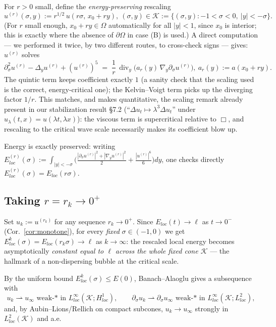 \documentclass[11pt,letterpaper]{amsart}
\newcommand{\dive}{\operatorname{div}}
\newcommand{\Om}{\Omega}
\begin{document}
For $r>0$ small, define the \emph{energy-preserving} rescaling
\[
u^{(r)}(\sigma,y) := r^{1/2}\,u(r\sigma,\, x_0+ry),~ (\sigma,y)\in \mathcal K:=\{(\sigma,y): -1<\sigma<0,\ |y|<-\sigma\}.
\]
(For $r$ small enough, $x_0+ry\in\Om$ automatically for all $|y|<1$, since $x_0$ is interior; this is exactly where the absence of $\partial\Om$ in case (B) is used.) A direct computation --- we performed it twice, by two different routes, to cross-check signs --- gives: $u^{(r)}$ solves
\begin{equation}\label{eq:rescaled}
\partial_\sigma^2u^{(r)} - \Delta_yu^{(r)} + (u^{(r)})^5 \;=\; \frac1r\,\dive_y\Big(a_r(y)\,\nabla_y\partial_\sigma u^{(r)}\Big),~ a_r(y):=a(x_0+ry).
\end{equation}
The quintic term keeps coefficient exactly $1$ (a sanity check that the scaling used is the correct, energy-critical one); the Kelvin--Voigt term picks up the diverging factor $1/r$. This matches, and makes quantitative, the scaling remark already present in our stabilization result \S7.2 (``$\Delta u_t\mapsto\lambda^3\Delta u_t$'' under $u_\lambda(t,x)=u(\lambda t,\lambda x)$): the viscous term is supercritical relative to $\Box$, and rescaling to the critical wave scale necessarily makes its coefficient blow up.

Energy is exactly preserved: writing $E^{(r)}_{loc}(\sigma):=\int_{|y|<-\sigma}\big(\tfrac{|\partial_\sigma u^{(r)}|^2+|\nabla_yu^{(r)}|^2}2+\tfrac{|u^{(r)}|^6}6\big)dy$, one checks directly $E^{(r)}_{loc}(\sigma)=E_{loc}(r\sigma)$.

\subsection{Taking $r=r_k\to0^+$}

Set $u_k:=u^{(r_k)}$ for any sequence $r_k\to0^+$. Since $E_{loc}(t)\to\ell$ as $t\to0^-$ (Cor.\ \ref{cor:monotone}), for every \emph{fixed} $\sigma\in(-1,0)$ we get $E_{loc}^k(\sigma)=E_{loc}(r_k\sigma)\to\ell$ as $k\to\infty$: the rescaled local energy becomes asymptotically \emph{constant equal to $\ell$ across the whole fixed cone $\mathcal K$} --- the hallmark of a non-dispersing bubble at the critical scale.

By the uniform bound $E_{loc}^k(\sigma)\le E(0)$, Banach--Alaoglu gives a subsequence with
\[
u_k\rightharpoonup u_\infty \text{ weak-* in } L^\infty_{loc}(\mathcal K;H^1_{loc}), \qquad \partial_\sigma u_k\rightharpoonup \partial_\sigma u_\infty \text{ weak-* in } L^\infty_{loc}(\mathcal K;L^2_{loc}),
\]
and, by Aubin--Lions/Rellich on compact subcones, $u_k\to u_\infty$ strongly in $L^2_{loc}(\mathcal K)$ and a.e.
\end{document}
